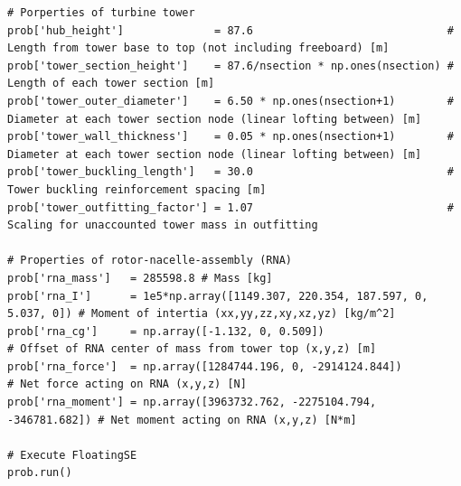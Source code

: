 \begin{lstlisting}
# Porperties of turbine tower
prob['hub_height']              = 87.6                              # Length from tower base to top (not including freeboard) [m]
prob['tower_section_height']    = 87.6/nsection * np.ones(nsection) # Length of each tower section [m]
prob['tower_outer_diameter']    = 6.50 * np.ones(nsection+1)        # Diameter at each tower section node (linear lofting between) [m]
prob['tower_wall_thickness']    = 0.05 * np.ones(nsection+1)        # Diameter at each tower section node (linear lofting between) [m]
prob['tower_buckling_length']   = 30.0                              # Tower buckling reinforcement spacing [m]
prob['tower_outfitting_factor'] = 1.07                              # Scaling for unaccounted tower mass in outfitting

# Properties of rotor-nacelle-assembly (RNA)
prob['rna_mass']   = 285598.8 # Mass [kg]
prob['rna_I']      = 1e5*np.array([1149.307, 220.354, 187.597, 0, 5.037, 0]) # Moment of intertia (xx,yy,zz,xy,xz,yz) [kg/m^2]
prob['rna_cg']     = np.array([-1.132, 0, 0.509])                       # Offset of RNA center of mass from tower top (x,y,z) [m]
prob['rna_force']  = np.array([1284744.196, 0, -2914124.844])           # Net force acting on RNA (x,y,z) [N]
prob['rna_moment'] = np.array([3963732.762, -2275104.794, -346781.682]) # Net moment acting on RNA (x,y,z) [N*m]

# Execute FloatingSE
prob.run()

\end{lstlisting}

